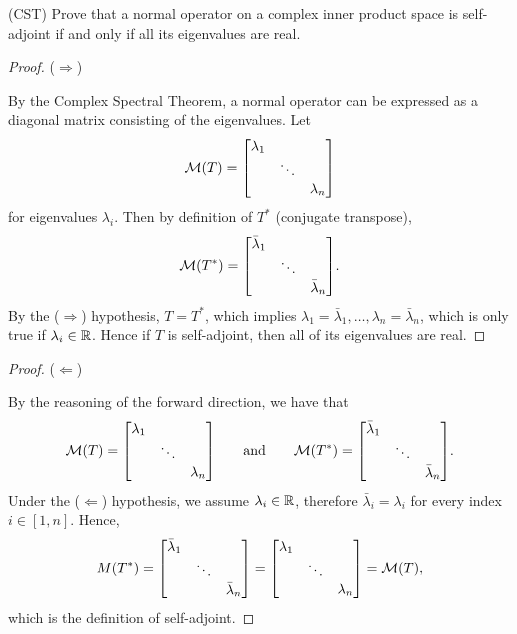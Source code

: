 (CST) Prove that a normal operator on a complex inner product space is self-adjoint if and only if all its eigenvalues are real.
\begin{proof} ($\Longrightarrow$)

    \nl By the Complex Spectral Theorem, a normal operator can be expressed as a diagonal matrix consisting of the eigenvalues. Let
    $$\mathcal M(T) =  \mqty[\dmat{\lambda_1}{\ddots}{\lambda_n}]$$
    for eigenvalues $\lambda_i$. Then by definition of $T^*$ (conjugate transpose),
    $$\mathcal M(T^*) = \mqty[\dmat{\bar{\lambda}_1}{\ddots}{\bar{\lambda}_n}].$$
    By the ($\Longrightarrow$) hypothesis, $T = T^*$, which implies $\lambda_1 = \bar{\lambda}_1, \dots, \lambda_n = \bar{\lambda}_n$, which is only true if $\lambda_i \in \mathbb{R}$. Hence if $T$ is self-adjoint, then all of its eigenvalues are real.
\end{proof}
\vspace{1in}
\begin{proof} ($\Longleftarrow$)

    \nl By the reasoning of the forward direction, we have that 
    $$\mathcal M(T) =  \mqty[\dmat{\lambda_1}{\ddots}{\lambda_n}] \qquad \text{and} \qquad \mathcal M(T^*) = \mqty[\dmat{\bar{\lambda}_1}{\ddots}{\bar{\lambda}_n}].$$
    Under the ($\Longleftarrow$) hypothesis, we assume $\lambda_i \in \mathbb{R}$, therefore $\bar{\lambda}_i = \lambda_i$ for every index $i \in [1, n]$. Hence,
    $$M(T^*) = \mqty[\dmat{\bar{\lambda}_1}{\ddots}{\bar{\lambda}_n}] =  \mqty[\dmat{\lambda_1}{\ddots}{\lambda_n}] = \mathcal M(T),$$
    which is the definition of self-adjoint.

\end{proof}